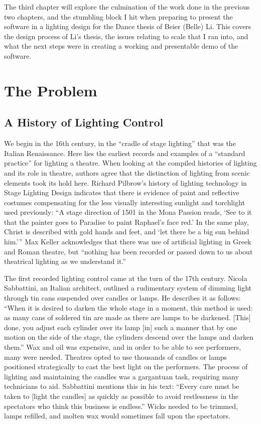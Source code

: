 \documentclass[
    12pt,
    twoside,
    bibstyle=chicago,
    headerstyle=uppercase,
	bibfile=thesis_updating.bib
]{reedthesis}
\begin{document}
    The third chapter will explore the culmination of the work done in the previous two chapters, and the stumbling block I hit when preparing to present the software in a lighting design for the Dance thesis of Beier (Belle) Li. This covers the design process of Li's thesis, the issues relating to scale that I ran into, and what the next steps were in creating a working and presentable demo of the software.
	
\chapter{The Problem}

\section{A History of Lighting Control}
We begin in the 16th century, in the “cradle of stage lighting” that was the Italian Renaissance. Here lies the earliest records and examples of a “standard practice” for lighting a theatre. When looking at the compiled histories of lighting and its role in theatre, authors agree that the distinction of lighting from scenic elements took its hold here. Richard Pilbrow’s history of lighting technology in Stage Lighting Design indicates that there is evidence of paint and reflective costumes compensating for the less visually interesting sunlight and torchlight used previously: “A stage direction of 1501 in the Mona Passion reads, ‘See to it that the painter goes to Paradise to paint Raphael’s face red.’ In the same play, Christ is described with gold hands and feet, and ‘let there be a big sun behind him.’” Max Keller acknowledges that there was use of artificial lighting in Greek and Roman theatre, but “nothing has been recorded or passed down to us about theatrical lighting as we understand it.”

The first recorded lighting control came at the turn of the 17th century. Nicola Sabbattini, an Italian architect, outlined a rudimentary system of dimming light through tin cans suspended over candles or lamps. He describes it as follows: “When it is desired to darken the whole stage in a moment, this method is used: as many cans of soldered tin are made as there are lamps to be darkened. [This] done, you adjust each cylinder over its lamp [in] such a manner that by one motion on the side of the stage, the cylinders descend over the lamps and darken them.” Wax and oil was expensive, and in order to be able to see performers, many were needed. Theatres opted to use thousands of candles or lamps positioned strategically to cast the best light on the performers. The process of lighting and maintaining the candles was a gargantuan task, requiring many technicians to aid. Sabbattini mentions this in his text: “Every care must be taken to [light the candles] as quickly as possible to avoid restlessness in the spectators who think this business is endless.” Wicks needed to be trimmed, lamps refilled, and molten wax would sometimes fall upon the spectators. 
\end{document}
